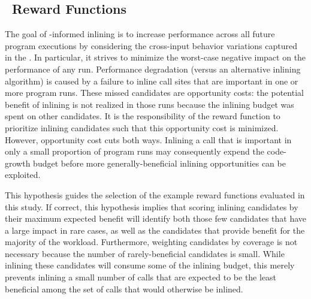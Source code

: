 \subsection{\FDI\ Reward Functions}
\label{eval:rewards}

The goal of \CP-informed inlining is to increase performance across
all future program executions by considering the cross-input behavior
variations captured in the \CProf.  In particular, it strives to
minimize the worst-case negative impact on the performance of any
run. Performance degradation (versus an alternative inlining
algorithm) is caused by a failure to inline call sites that are
important in one or more program runs.  These missed candidates are
opportunity costs: the potential benefit of inlining is not realized
in those runs because the inlining budget was spent on other
candidates.  It is the responsibility of the reward function to
prioritize inlining candidates such that this opportunity cost is
minimized.  However, opportunity cost cuts both ways.  Inlining a call
that is important in only a small proportion of program runs may
consequently expend the code-growth budget before more
generally-beneficial inlining opportunities can be exploited.

%
This hypothesis guides the selection of the example reward functions
evaluated in this study.  If correct, this hypothesis implies that
scoring inlining candidates by their maximum expected benefit will
identify both those few candidates that have a large impact in rare
cases, as well as the candidates that provide benefit for the majority
of the workload.  Furthermore, weighting candidates by coverage is not
necessary because the number of rarely-beneficial candidates is
small.  While inlining these candidates will consume some of the
inlining budget, this merely prevents inlining a small number of calls
that are expected to be the least beneficial among the set of calls
that would otherwise be inlined.



